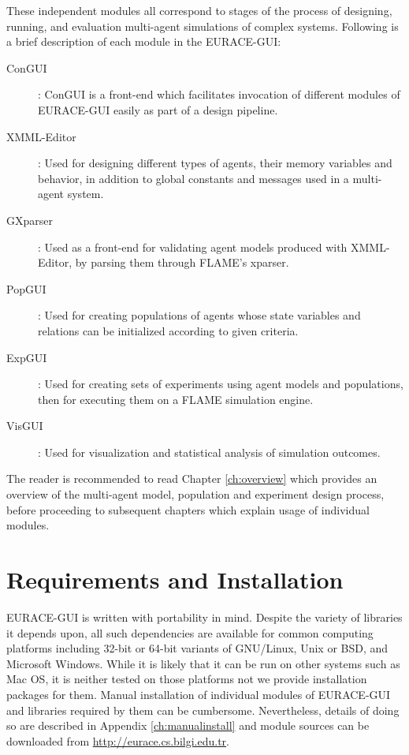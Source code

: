 \documentclass[urop]{socreport}
\begin{document}
These independent modules all correspond to stages of the process of designing, running, and evaluation multi-agent simulations of complex systems. Following is a brief description of each module in the EURACE-GUI:
\begin{description}
\item[ConGUI]: ConGUI is a front-end which facilitates invocation of different modules of EURACE-GUI easily as part of a design pipeline.
\item[XMML-Editor]: Used for designing different types of agents, their memory variables and behavior, in addition to global constants and messages used in a multi-agent system.
\item[GXparser]: Used as a front-end for validating agent models produced with XMML-Editor, by parsing them through FLAME's xparser.
\item[PopGUI]: Used for creating populations of agents whose state variables and relations can be initialized according to given criteria.
\item[ExpGUI]: Used for creating sets of experiments using agent models and populations, then for executing them on a FLAME simulation engine.
\item[VisGUI]: Used for visualization and statistical analysis of simulation outcomes.
\end{description}

The reader is recommended to read Chapter \ref{ch:overview} which provides an overview of the multi-agent model, population and experiment design process, before proceeding to subsequent chapters which explain usage of individual modules. 

 
\chapter{Requirements and Installation}
EURACE-GUI is written with portability in mind. Despite the variety of libraries it depends upon, all such dependencies are available for common computing platforms including 32-bit or 64-bit variants of GNU/Linux, Unix or BSD, and Microsoft Windows. While it is likely that it can be run on other systems such as Mac OS, it is neither tested on those platforms not we provide installation packages for them. Manual installation of individual modules of EURACE-GUI and libraries required by them can be cumbersome. Nevertheless, details of doing so are described in Appendix \ref{ch:manualinstall} and module sources can be downloaded from \url{http://eurace.cs.bilgi.edu.tr}.
\end{document}
